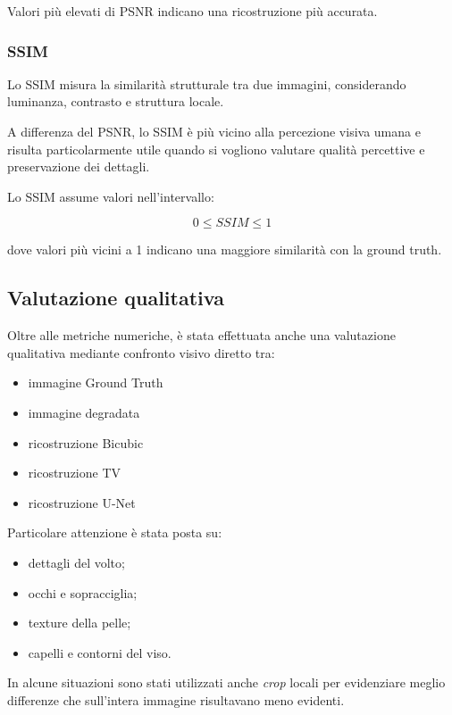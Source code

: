 \documentclass{article}
\begin{document}
Valori più elevati di PSNR indicano una ricostruzione più accurata.

\subsubsection{SSIM}

Lo SSIM misura la similarità strutturale tra due immagini, considerando luminanza, contrasto e struttura locale.

A differenza del PSNR, lo SSIM è più vicino alla percezione visiva umana e risulta particolarmente utile quando si vogliono valutare qualità percettive e preservazione dei dettagli.

Lo SSIM assume valori nell’intervallo:

\[
0 \leq SSIM \leq 1
\]

dove valori più vicini a 1 indicano una maggiore similarità con la ground truth.

\subsection{Valutazione qualitativa}

Oltre alle metriche numeriche, è stata effettuata anche una valutazione qualitativa mediante confronto visivo diretto tra:

\begin{itemize}
    \item immagine Ground Truth
    \item immagine degradata
    \item ricostruzione Bicubic
    \item ricostruzione TV
    \item ricostruzione U-Net
\end{itemize}

Particolare attenzione è stata posta su:

\begin{itemize}
    \item dettagli del volto;
    \item occhi e sopracciglia;
    \item texture della pelle;
    \item capelli e contorni del viso.
\end{itemize}

In alcune situazioni sono stati utilizzati anche \textit{crop} locali per evidenziare meglio differenze che sull’intera immagine risultavano meno evidenti.
\end{document}
